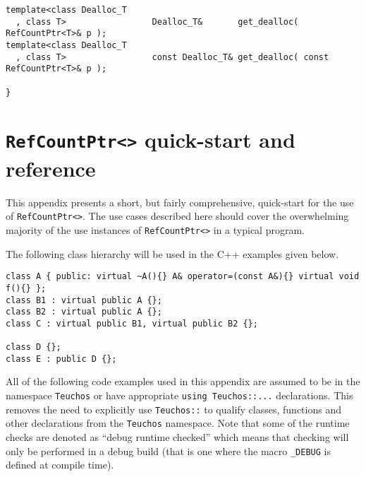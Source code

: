 \documentclass[pdf,ps2pdf,11pt]{SANDreport}
\begin{document}
{\scriptsize\begin{verbatim}
template<class Dealloc_T
  , class T>                 Dealloc_T&       get_dealloc( RefCountPtr<T>& p );
template<class Dealloc_T
  , class T>                 const Dealloc_T& get_dealloc( const RefCountPtr<T>& p );

}
\end{verbatim}}

%
\section{\texttt{RefCountPtr<>} quick-start and reference}
\label{rcpqs:apdx:quickstart}
%

This appendix presents a short, but fairly comprehensive, quick-start
for the use of {}\texttt{Ref\-Count\-Ptr<>}.  The use cases described
here should cover the overwhelming majority of the use instances of
{}\texttt{Ref\-Count\-Ptr<>} in a typical program.

The following class hierarchy will be used in the C++ examples given
below.

{\small\begin{verbatim}
class A { public: virtual ~A(){} A& operator=(const A&){} virtual void f(){} };
class B1 : virtual public A {};
class B2 : virtual public A {};
class C : virtual public B1, virtual public B2 {};

class D {};
class E : public D {};
\end{verbatim}}

All of the following code examples used in this appendix are assumed
to be in the namespace {}\texttt{Teuchos} or have appropriate
{}\texttt{using Teuchos::...} declarations.  This removes the need to
explicitly use {}\texttt{Teuchos::} to qualify classes, functions and
other declarations from the {}\texttt{Teuchos} namespace.  Note that
some of the runtime checks are denoted as ``debug runtime checked''
which means that checking will only be performed in a debug build
(that is one where the macro {}\texttt{\_DEBUG} is defined at compile time).
\end{document}
